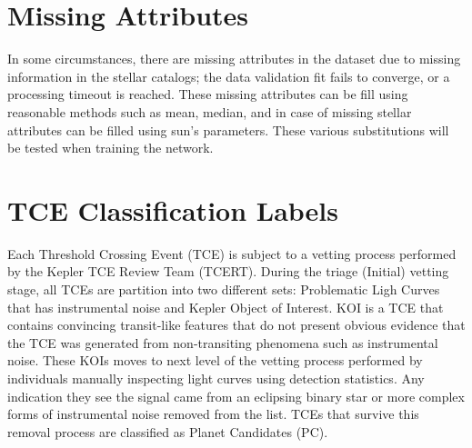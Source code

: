 

\section{Missing Attributes}
In some circumstances, there are missing attributes in the dataset due to missing information in the stellar catalogs; the data validation fit fails to converge, or a processing timeout is reached. These missing attributes can be fill using reasonable methods such as mean, median, and in case of missing stellar attributes can be filled using sun's parameters. These various substitutions will be tested when training the network.

\section{TCE Classification Labels}

Each Threshold Crossing Event (TCE) is subject to a vetting process performed by the Kepler TCE Review Team (TCERT). During the triage (Initial) vetting stage, all TCEs are partition into two different sets: Problematic Ligh Curves that has instrumental noise and Kepler Object of Interest. KOI is a TCE that contains convincing transit-like features that do not present obvious evidence that the TCE was generated from non-transiting phenomena such as instrumental noise. These KOIs moves to next level of the vetting process performed by individuals manually inspecting light curves using detection statistics. Any indication they see the signal came from an eclipsing binary star or more complex forms of instrumental noise removed from the list. TCEs that survive this removal process are classified as Planet Candidates (PC).


